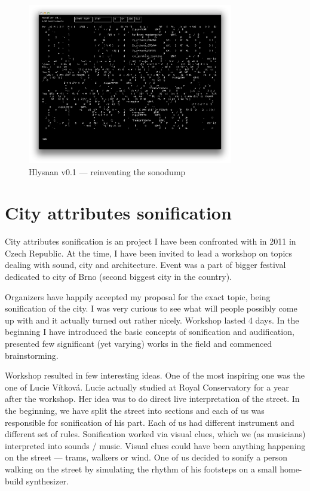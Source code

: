 \documentclass[12pt,a4paper,oneside]{report}
\begin{document}
\begin{figure}  
  \centering
    \includegraphics[width=0.8\textwidth]{img/hlysnan}%
	\caption{Hlysnan v0.1 --- reinventing the sonodump}
	\label{fig:hlysnan}
\end{figure}

\clearpage

\section{City attributes sonification}

City attributes sonification is an project I have been confronted with in 2011 in Czech Republic. At the time, I have been invited to lead a workshop on topics dealing with sound, city and architecture. Event was a part of bigger festival dedicated to city of Brno (second biggest city in the country).

Organizers have happily accepted my proposal for the exact topic, being sonification of the city. I was very curious to see what will people possibly come up with and it actually turned out rather nicely. Workshop lasted 4 days. In the beginning I have introduced the basic concepts of sonification and audification, presented few significant (yet varying) works in the field and commenced brainstorming.

Workshop resulted in few interesting ideas. One of the most inspiring one was the one of Lucie Vítková. Lucie actually studied at Royal Conservatory for a year after the workshop. Her idea was to do direct live interpretation of the street.  In the beginning, we have split the street into sections and each of us was responsible for sonification of his part. Each of us had different instrument and different set of rules. Sonification worked via visual clues, which we (as musicians) interpreted into sounds / music. Visual clues could have been anything happening on the street --- trams, walkers or wind. One of us decided to sonify a person walking on the street by simulating the rhythm of his footsteps on a small home-build synthesizer.
\end{document}

